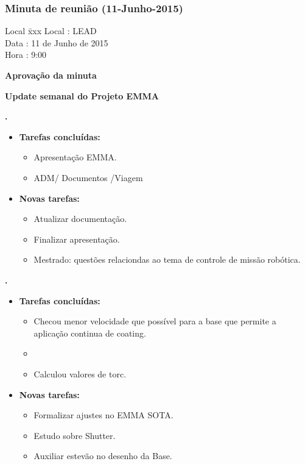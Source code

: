 \subsubsection{Minuta de reunião (11-Junho-2015)}

\begin{tabbing}
  Local \= xxx \kill
  Local \> : LEAD \\
  Data  \> : 11 de Junho de 2015 \\
  Hora  \> : 9:00
\end{tabbing}


\textbf{Aprovação da minuta}

\textbf{Update semanal do Projeto EMMA}
   
\textbf{\julia.} 
	\begin{itemize}
		\item \textbf{Tarefas concluídas:}
			\begin{itemize}    
				\item Apresentação EMMA.
				\item ADM/ Documentos /Viagem
			\end{itemize}
		
		\item \textbf{Novas tarefas:}
			\begin{itemize} 
				\item Atualizar documentação.
				\item Finalizar apresentação.
				\item Mestrado: questões relaciondas ao tema de controle de missão
				robótica.
			\end{itemize}
	\end{itemize}
					
		
\textbf{\elael.} 
	\begin{itemize}
		\item \textbf{Tarefas concluídas:}
			\begin{itemize}    
				\item Checou menor velocidade que possível para a base que permite a
				aplicação continua de coating.
				\item \item Calculou valores de torc.
			\end{itemize}
		
		\item \textbf{Novas tarefas:}
			\begin{itemize} 
				\item Formalizar ajustes no EMMA SOTA.
				\item Estudo sobre Shutter.
				\item Auxiliar estevão no desenho da Base.
			\end{itemize}
	\end{itemize}
					
